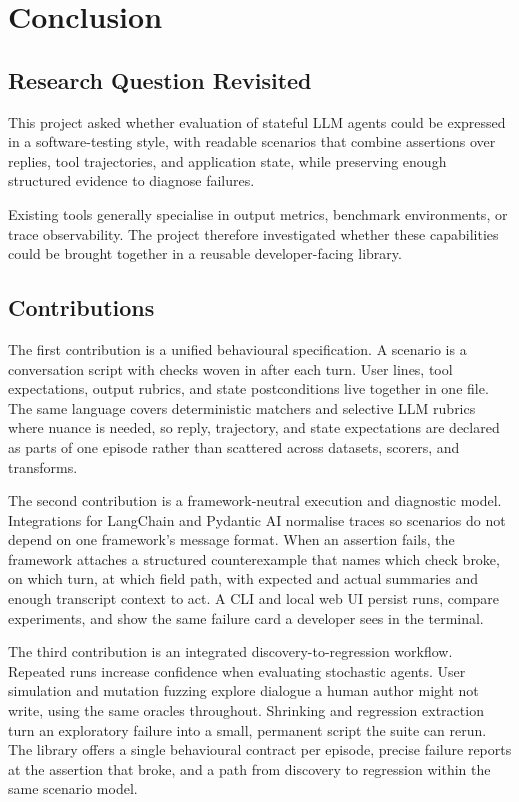 \chapter{Conclusion}
\label{chap:conclusion}

\section{Research Question Revisited}

This project asked whether evaluation of stateful LLM agents could be expressed in a software-testing style, with readable scenarios that combine assertions over replies, tool trajectories, and application state, while preserving enough structured evidence to diagnose failures.

Existing tools generally specialise in output metrics, benchmark environments, or trace observability. The project therefore investigated whether these capabilities could be brought together in a reusable developer-facing library.

\section{Contributions}

The first contribution is a unified behavioural specification. A scenario is a conversation script with checks woven in after each turn. User lines, tool expectations, output rubrics, and state postconditions live together in one file. The same language covers deterministic matchers and selective LLM rubrics where nuance is needed, so reply, trajectory, and state expectations are declared as parts of one episode rather than scattered across datasets, scorers, and transforms.

The second contribution is a framework-neutral execution and diagnostic model. Integrations for LangChain and Pydantic AI normalise traces so scenarios do not depend on one framework's message format. When an assertion fails, the framework attaches a structured counterexample that names which check broke, on which turn, at which field path, with expected and actual summaries and enough transcript context to act. A CLI and local web UI persist runs, compare experiments, and show the same failure card a developer sees in the terminal.

The third contribution is an integrated discovery-to-regression workflow. Repeated runs increase confidence when evaluating stochastic agents. User simulation and mutation fuzzing explore dialogue a human author might not write, using the same oracles throughout. Shrinking and regression extraction turn an exploratory failure into a small, permanent script the suite can rerun. The library offers a single behavioural contract per episode, precise failure reports at the assertion that broke, and a path from discovery to regression within the same scenario model.

